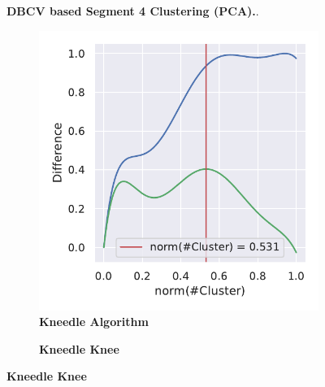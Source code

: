 \begin{figure}
\begin{subfigure}[b]{0.475\textwidth}
    \end{subfigure}
    \caption[\Acrshort{DBCV} based Segment 4 Clustering (\Acrshort{PCA})]{\textbf{\Acrshort{DBCV} based Segment 4 Clustering (\Acrshort{PCA}).}.}
    \label{fig:PCA_Cluster_DBCV_4}
\end{figure}

\begin{figure}
    \centering
    \begin{subfigure}[b]{0.475\textwidth}
        \caption[Kneedle Algorithm]{\textbf{Kneedle Algorithm}}
        \label{subfig:UMAP_Cluster_Knee_Kneedle_4}            \includegraphics[width=\textwidth]{UMAP/Cluster_Knee_Segment_4.pdf}
    \end{subfigure}
    \hfill
    \begin{subfigure}[b]{0.475\textwidth}
        \caption[Kneedle Knee]{\textbf{Kneedle Knee}}

\end{subfigure}
\end{figure}
